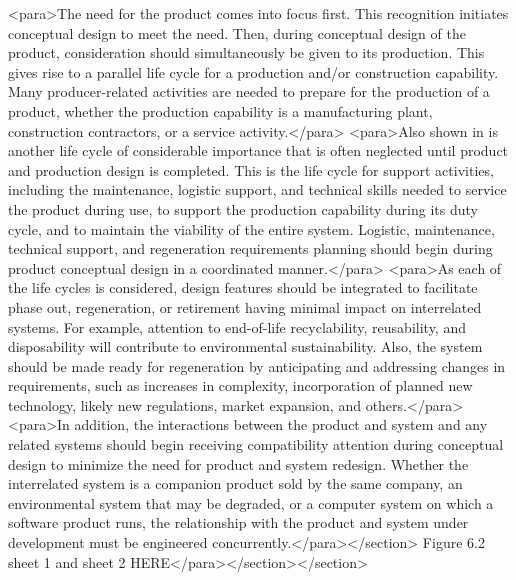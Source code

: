 <para>The need for the product comes into focus first. This recognition initiates conceptual design to meet the need. Then, during conceptual design of the product, consideration should simultaneously be given to its production. This gives rise to a parallel life cycle for a production and/or construction capability. Many producer-related activities are needed to prepare for the production of a product, whether the production capability is a manufacturing plant, construction contractors, or a service activity.</para>
<para>Also shown in is another life cycle of considerable importance that is often neglected until product and production design is completed. This is the life cycle for support activities, including the maintenance, logistic support, and technical skills needed to service the product during use, to support the production capability during its duty cycle, and to maintain the viability of the entire system. Logistic, maintenance, technical support, and regeneration requirements planning should begin during product conceptual design in a coordinated manner.</para>
<para>As each of the life cycles is considered, design features should be integrated to facilitate phase out, regeneration, or retirement having minimal impact on interrelated systems. For example, attention to end-of-life recyclability, reusability, and disposability will contribute to environmental sustainability. Also, the system should be made ready for regeneration by anticipating and addressing changes in requirements, such as increases in complexity, incorporation of planned new technology, likely new regulations, market expansion, and others.</para>
<para>In addition, the interactions between the product and system and any related systems should begin receiving compatibility attention during conceptual design to minimize the need for product and system redesign. Whether the interrelated system is a companion product sold by the same company, an environmental system that may be degraded, or a computer system on which a software product runs, the relationship with the product and system under development must be engineered concurrently.</para></section>
Figure 6.2 sheet 1 and sheet 2 HERE</para></section></section>

